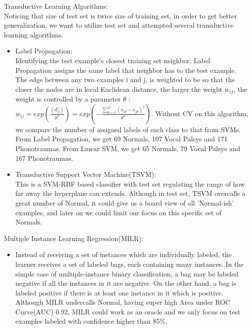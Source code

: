 Transductive Learning Algorithms:\newline\\
\indent Noticing that size of test set is twice size of training set, in order to get better generalization, we want to utilize test set and attempted several transductive learning algorithms. \\
\begin{itemize}
	\item Label Propagation:\\
	Identifying the test example's closest training set neighbor, Label Propagation assigns the same label that neighbor has to the test example. The edge between any two examples i and j, is weighted to be so that the closer the nodes are in local Euclidean distance, the larger the weight $w_{ij}$, the weight is controlled by a parameter $\theta$ :  $w_{ij} = exp (\frac{(d_{ij}^2)}{\theta^2}) = exp (-\frac{\sum_{d = 1}^{D} (x_{id} - x_{jd})^2}{\theta^2} )$. \cite{b13}Without CV on this algorithm, we compare the number of assigned labels of each class to that from SVMs. From Label Propagation, we get 69 Normals, 107 Vocal Palsys and 171 Phonotraumas. From Linear SVM, we get 65 Normals, 79 Vocal Palsys and 167 Phonotraumas.\\
	\item Transductive Support Vector Machine(TSVM):\\
	This is a SVM-RBF based classifier with test set regulating the range of how far away the hyperplane can extends. Although in test set, TSVM overcalls a great number of Normal, it could give us a board view of all 'Normal-ish' examples, and later on we could limit our focus on this specific set of Normals. \\
\end{itemize}

Multiple Instance Learning Regression(MILR):\\
\begin{itemize}
	\item 
	Instead of receiving a set of instances which are individually labeled, the learner receives a set of labeled bags, each containing many instances. In the simple case of multiple-instance binary classification, a bag may be labeled negative if all the instances in it are negative. On the other hand, a bag is labeled positive if there is at least one instance in it which is positive. \cite{b10} Although MILR undercalls Normal, having super high Area under ROC Curve(AUC) 0.92, MILR could work as an oracle and we only focus on test examples labeled with confidence higher than 85\%.\\
\end{itemize}
